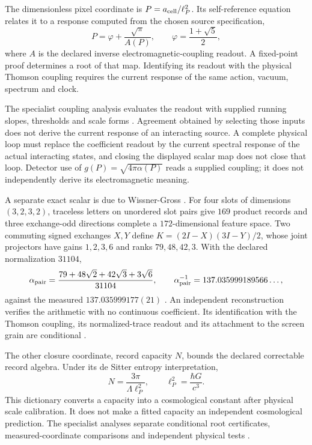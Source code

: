\documentclass[11pt]{article}
\theoremstyle{definition}
\theoremstyle{remark}
\begin{document}
The dimensionless pixel coordinate is $P=a_{\rm cell}/\ell_P^2$.
Its self-reference equation relates it to a response computed from the
chosen source specification,
\[
 P=\varphi+\frac{\sqrt\pi}{A(P)},\qquad
 \varphi=\frac{1+\sqrt5}{2},
\]
where $A$ is the declared inverse electromagnetic-coupling readout.
A fixed-point proof determines a root of that map. Identifying its readout
with the physical Thomson coupling requires the current response of the
same action, vacuum, spectrum and clock.

The specialist coupling analysis evaluates the readout with supplied
running slopes, thresholds and scale forms \cite{ophalpha}. Agreement
obtained by selecting those inputs does not derive the current response of
an interacting source. A complete physical loop must replace the
coefficient readout by the current spectral response of the actual
interacting states, and closing the displayed scalar map does not close
that loop. Detector use of $g(P)=\sqrt{4\pi\alpha(P)}$ reads
a supplied coupling; it does not independently derive its electromagnetic
meaning.

A separate exact scalar is due to Wissner-Gross \cite{wissnergross2026pairs}. For four slots of
dimensions $(3,2,3,2)$, traceless letters on unordered slot pairs give $169$ product records and three
exchange-odd directions complete a $172$-dimensional feature space. Two commuting signed exchanges
$X,Y$ define $K=(2I-X)(3I-Y)/2$, whose joint projectors have gains $1,2,3,6$ and ranks $79,48,42,3$. With
the declared normalization $31104$,
\[
 \alpha_{\rm pair}=\frac{79+48\sqrt2+42\sqrt3+3\sqrt6}{31104},\qquad
 \alpha_{\rm pair}^{-1}=137.035999189566\ldots,
\]
against the measured $137.035999177(21)$ \cite{codata2022}. An independent reconstruction verifies the
arithmetic with no continuous coefficient. Its identification with the Thomson coupling, its
normalized-trace readout and its attachment to the screen grain are conditional \cite{ophalpha}.

The other closure coordinate, record capacity $N$, bounds the declared
correctable record algebra. Under its de Sitter entropy interpretation,
\begin{equation}
 N=\frac{3\pi}{\Lambda\ell_P^2},\qquad
 \ell_P^2=\frac{\hbar G}{c^3}.
\label{eq:capacity-lambda}
\end{equation}
This dictionary converts a capacity into a cosmological constant after
physical scale calibration. It does not make a fitted capacity an
independent cosmological prediction. The specialist analyses separate
conditional root certificates, measured-coordinate comparisons and
independent physical tests \cite{ophalpha,ophvacuum}.
\end{document}
